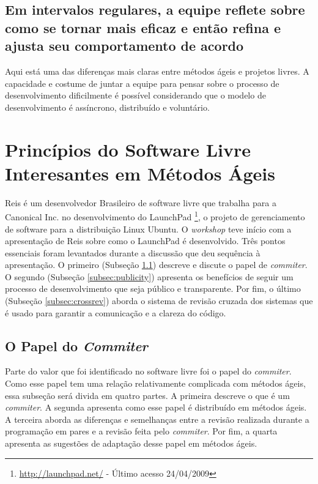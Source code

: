 \subsection{Em intervalos regulares, a equipe reflete sobre como se
  tornar mais eficaz e então refina e ajusta seu comportamento de
  acordo}

Aqui está uma das diferenças mais claras entre métodos ágeis e
projetos livres. A capacidade e costume de juntar a equipe para pensar
sobre o processo de desenvolvimento dificilmente é possível
considerando que o modelo de desenvolvimento é assíncrono, distribuído
e voluntário.

\section{Princípios do Software Livre Interesantes em Métodos Ágeis}
\label{sec:foss-over-agile}

Reis é um desenvolvedor Brasileiro de software livre que trabalha para
a Canonical Inc. no desenvolvimento do LaunchPad
\footnote{\url{http://launchpad.net/} - Último acesso 24/04/2009}, o
projeto de gerenciamento de software para a distribuição Linux
Ubuntu. O \emph{workshop} teve início com a apresentação de Reis sobre
como o LaunchPad é desenvolvido. Três pontos essenciais foram
levantados durante a discussão que deu sequência à apresentação. O
primeiro (Subseção \ref{subsec:commiter}) descreve e discute o papel
de \emph{commiter}.  O segundo (Subseção \ref{subsec:publicity})
apresenta os benefícios de seguir um processo de desenvolvimento que
seja público e transparente.  Por fim, o último (Subseção
\ref{subsec:crossrev}) aborda o sistema de revisão cruzada dos
sistemas que é usado para garantir a comunicação e a clareza do
código.

\subsection{O Papel do \emph{Commiter}}
\label{subsec:commiter}

Parte do valor que foi identificado no software livre foi o papel do
\emph{commiter}. Como esse papel tem uma relação relativamente
complicada com métodos ágeis, essa subseção será divida em quatro
partes. A primeira descreve o que é um \emph{commiter}. A segunda
apresenta como esse papel é distribuído em métodos ágeis. A terceira
aborda as diferenças e semelhanças entre a revisão realizada durante a
programação em pares e a revisão feita pelo \emph{commiter}. Por fim,
a quarta apresenta as sugestões de adaptação desse papel em métodos
ágeis.

